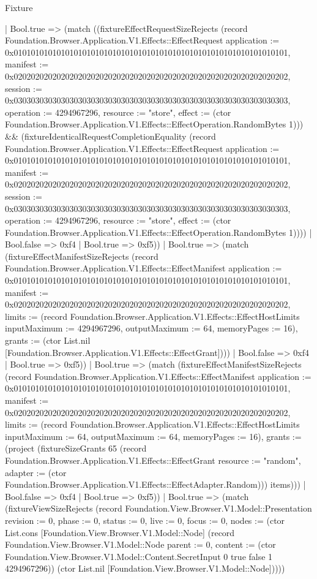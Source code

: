 \begin{lexlean}{Fixture}
\begin{semanticmodule}
{                          | Bool.true => (match ((fixtureEffectRequestSizeRejects (record Foundation.Browser.Application.V1.Effects::EffectRequest {application := 0x0101010101010101010101010101010101010101010101010101010101010101, manifest := 0x0202020202020202020202020202020202020202020202020202020202020202, session := 0x0303030303030303030303030303030303030303030303030303030303030303, operation := 4294967296, resource := "store", effect := (ctor Foundation.Browser.Application.V1.Effects::EffectOperation.RandomBytes 1)})) && (fixtureIdenticalRequestCompletionEquality (record Foundation.Browser.Application.V1.Effects::EffectRequest {application := 0x0101010101010101010101010101010101010101010101010101010101010101, manifest := 0x0202020202020202020202020202020202020202020202020202020202020202, session := 0x0303030303030303030303030303030303030303030303030303030303030303, operation := 4294967296, resource := "store", effect := (ctor Foundation.Browser.Application.V1.Effects::EffectOperation.RandomBytes 1)})))
                            | Bool.false => 0xf4
                            | Bool.true => 0xf5))
                        | Bool.true => (match (fixtureEffectManifestSizeRejects (record Foundation.Browser.Application.V1.Effects::EffectManifest {application := 0x0101010101010101010101010101010101010101010101010101010101010101, manifest := 0x0202020202020202020202020202020202020202020202020202020202020202, limits := (record Foundation.Browser.Application.V1.Effects::EffectHostLimits {inputMaximum := 4294967296, outputMaximum := 64, memoryPages := 16}), grants := (ctor List.nil [Foundation.Browser.Application.V1.Effects::EffectGrant])}))
                          | Bool.false => 0xf4
                          | Bool.true => 0xf5))
                      | Bool.true => (match (fixtureEffectManifestSizeRejects (record Foundation.Browser.Application.V1.Effects::EffectManifest {application := 0x0101010101010101010101010101010101010101010101010101010101010101, manifest := 0x0202020202020202020202020202020202020202020202020202020202020202, limits := (record Foundation.Browser.Application.V1.Effects::EffectHostLimits {inputMaximum := 64, outputMaximum := 64, memoryPages := 16}), grants := (project (fixtureSizeGrants 65 (record Foundation.Browser.Application.V1.Effects::EffectGrant {resource := "random", adapter := (ctor Foundation.Browser.Application.V1.Effects::EffectAdapter.Random)})) items)}))
                        | Bool.false => 0xf4
                        | Bool.true => 0xf5))
                    | Bool.true => (match (fixtureViewSizeRejects (record Foundation.View.Browser.V1.Model::Presentation {revision := 0, phase := 0, status := 0, live := 0, focus := 0, nodes := (ctor List.cons [Foundation.View.Browser.V1.Model::Node] (record Foundation.View.Browser.V1.Model::Node {parent := 0, content := (ctor Foundation.View.Browser.V1.Model::Content.SecretInput 0 true false 1 4294967296)}) (ctor List.nil [Foundation.View.Browser.V1.Model::Node]))}))
}
\end{semanticmodule}
\end{lexlean}

